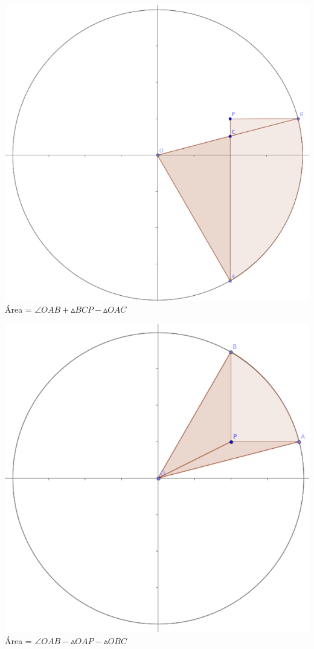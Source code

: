 \begin{center}
\begin{multicols}{2}
\includegraphics[scale=1.2]{A2.png}\\
Área = $\angle OAB + \vartriangle BCP - \vartriangle OAC$\\
\end{multicols}
\begin{multicols}{2}
\includegraphics[scale=1.2]{A3.png}\\
Área = $\angle OAB - \vartriangle OAP - \vartriangle OBC$\\


\end{multicols}
\end{center}
